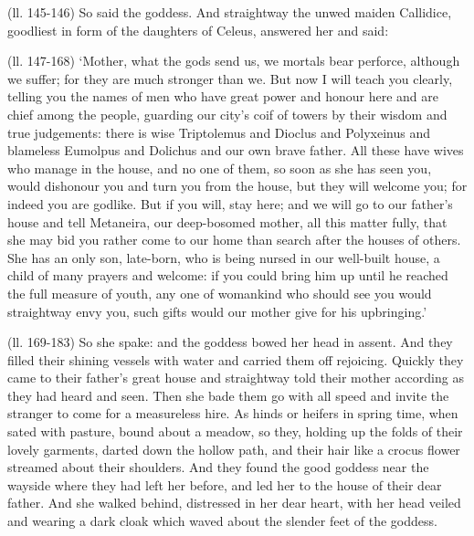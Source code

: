(ll. 145-146) So said the goddess. And straightway the unwed maiden Callidice,
goodliest in form of the daughters of Celeus, answered her and said:

(ll. 147-168) ‘Mother, what the gods send us, we mortals bear perforce,
although we suffer; for they are much stronger than we. But now I will teach
you clearly, telling you the names of men who have great power and honour here
and are chief among the people, guarding our city’s coif of towers by
their wisdom and true judgements: there is wise Triptolemus and Dioclus and
Polyxeinus and blameless Eumolpus and Dolichus and our own brave father. All
these have wives who manage in the house, and no one of them, so soon as she
has seen you, would dishonour you and turn you from the house, but they will
welcome you; for indeed you are godlike. But if you will, stay here; and we
will go to our father’s house and tell Metaneira, our deep-bosomed
mother, all this matter fully, that she may bid you rather come to our home
than search after the houses of others. She has an only son, late-born, who is
being nursed in our well-built house, a child of many prayers and welcome: if
you could bring him up until he reached the full measure of youth, any one of
womankind who should see you would straightway envy you, such gifts would our
mother give for his upbringing.’

(ll. 169-183) So she spake: and the goddess bowed her head in assent. And they
filled their shining vessels with water and carried them off rejoicing. Quickly
they came to their father’s great house and straightway told their mother
according as they had heard and seen. Then she bade them go with all speed and
invite the stranger to come for a measureless hire. As hinds or heifers in
spring time, when sated with pasture, bound about a meadow, so they, holding up
the folds of their lovely garments, darted down the hollow path, and their hair
like a crocus flower streamed about their shoulders. And they found the good
goddess near the wayside where they had left her before, and led her to the
house of their dear father. And she walked behind, distressed in her dear
heart, with her head veiled and wearing a dark cloak which waved about the
slender feet of the goddess.

